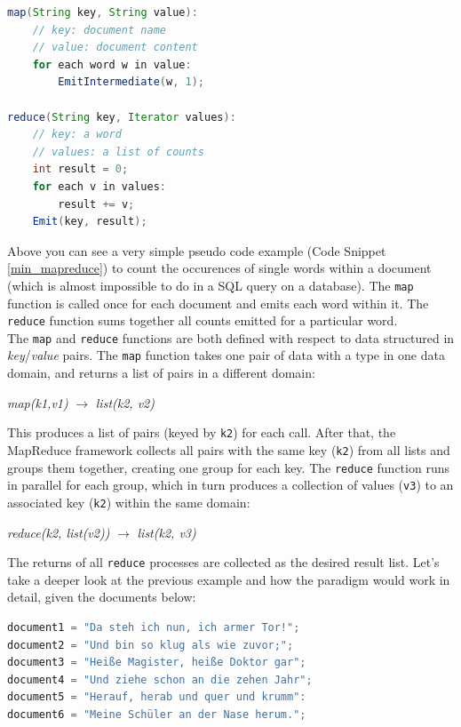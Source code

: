 {\begin{lstlisting}[aboveskip=1ex, belowskip=1ex, xleftmargin=18pt, emphstyle=\underbar, breaklines=true, showstringspaces=false, captionpos=b, caption=MapReduce Example - \textit{Word Count}, label=min_mapreduce, float,language=java]
map(String key, String value):
	// key: document name
	// value: document content
	for each word w in value:
		EmitIntermediate(w, 1);

reduce(String key, Iterator values):
	// key: a word
	// values: a list of counts
	int result = 0;
	for each v in values:
		result += v;
	Emit(key, result);
\end{lstlisting}

Above you can see a very simple pseudo code example (Code Snippet \ref{min_mapreduce}) to count the occurences of single words within a document (which is almost impossible to do in a SQL query on a database). The \lstinline{map} function is called once for each document and emits each word within it. The \lstinline{reduce} function sums together all counts emitted for a particular word. \\
The \lstinline{map} and \lstinline{reduce} functions are both defined with respect to data structured in \textit{key}/\textit{value} pairs. The \lstinline{map} function takes one pair of data with a type in one data domain, and returns a list of pairs in a different domain:\\
\centerline{\textit{map(k1,v1)} \ensuremath{\rightarrow} \textit{list(k2, v2)}}
This produces a list of pairs (keyed by \lstinline{k2}) for each call. After that, the MapReduce framework collects all pairs with the same key (\lstinline{k2}) from all lists and groups them together, creating one group for each key. The \lstinline{reduce} function runs in parallel for each group, which in turn produces a collection of values (\lstinline{v3}) to an associated key (\lstinline{k2}) within the same domain:\\
\centerline{\textit{reduce(k2, list(v2))} \ensuremath{\rightarrow} \textit{list(k2, v3)}}

The returns of all \lstinline{reduce} processes are collected as the desired result list. 
\newpage
Let's take a deeper look at the previous example and how the paradigm would work in detail, given the documents below:\\

\begin{lstlisting}[aboveskip=1ex, belowskip=3ex, xleftmargin=18pt, emphstyle=\underbar, breaklines=true, showstringspaces=false, captionpos=b, caption=MR Example - \textit{Word Count (Input Documents)}, label=min_mapreduce_documents,language=java]
document1 = "Da steh ich nun, ich armer Tor!";
document2 = "Und bin so klug als wie zuvor;";
document3 = "Heiße Magister, heiße Doktor gar";
document4 = "Und ziehe schon an die zehen Jahr";
document5 = "Herauf, herab und quer und krumm":
document6 = "Meine Schüler an der Nase herum.";
\end{lstlisting}

}
